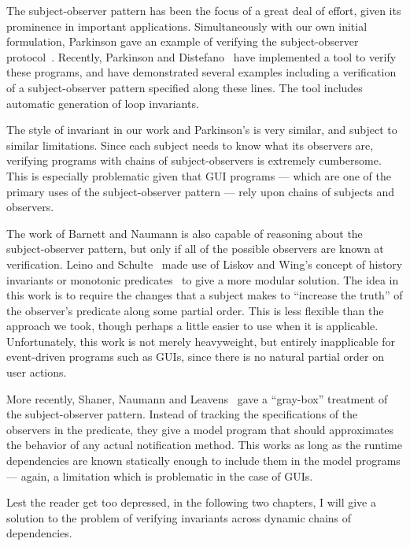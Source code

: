 The subject-observer pattern has been the focus of a great deal of
effort, given its prominence in important applications. Simultaneously
with our own initial formulation, Parkinson gave an example of
verifying the subject-observer
protocol~\cite{parkinson-iwaco-07}. Recently, Parkinson and
Distefano~\cite{jstar-parkinson-distefano} have implemented a tool to
verify these programs, and have demonstrated several examples
including a verification of a subject-observer pattern specified along
these lines. The tool includes automatic generation of loop
invariants.

The style of invariant in our work and Parkinson's is very similar,
and subject to similar limitations. Since each subject needs to know
what its observers are, verifying programs with chains of
subject-observers is extremely cumbersome. This is especially
problematic given that GUI programs --- which are one of the primary
uses of the subject-observer pattern --- rely upon chains of subjects
and observers.

The work of Barnett and Naumann is also capable of reasoning about the
subject-observer pattern, but only if all of the possible observers
are known at verification.  Leino and Schulte~\cite{boogie-sub-obs}
made use of Liskov and Wing's concept of history invariants or
monotonic predicates~\cite{liskov-wing} to give a more modular
solution. The idea in this work is to require the changes that a
subject makes to ``increase the truth'' of the observer's predicate
along some partial order. This is less flexible than the approach we
took, though perhaps a little easier to use when it is
applicable. Unfortunately, this work is not merely heavyweight, but
entirely inapplicable for event-driven programs such as GUIs, since
there is no natural partial order on user actions.

More recently, Shaner, Naumann and Leavens~\cite{ShanerLN07} gave a
``gray-box'' treatment of the subject-observer pattern.  Instead of
tracking the specifications of the observers in the predicate, they
give a model program that should approximates the behavior of any
actual notification method. This works as long as the runtime
dependencies are known statically enough to include them in the model
programs --- again, a limitation which is problematic in the case of
GUIs.

Lest the reader get too depressed, in the following two chapters, I
will give a solution to the problem of verifying invariants across
dynamic chains of dependencies.

